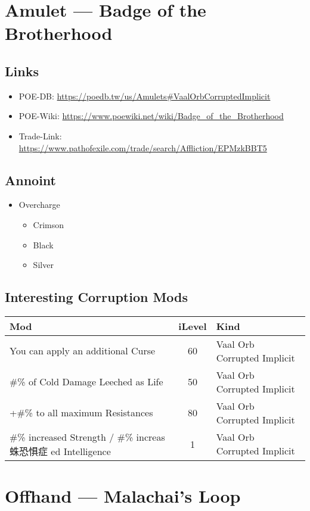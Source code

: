 
\section{Amulet --- Badge of the Brotherhood}
\subsection{Links}
\begin{itemize}
	\item POE-DB: \url{https://poedb.tw/us/Amulets#VaalOrbCorruptedImplicit}
	\item POE-Wiki: \url{https://www.poewiki.net/wiki/Badge_of_the_Brotherhood}
	\item Trade-Link: \url{https://www.pathofexile.com/trade/search/Affliction/EPMzkBBT5}
\end{itemize}

\subsection{Annoint}
\begin{itemize}
	\item Overcharge
	\begin{itemize}
		\item Crimson
		\item Black
		\item Silver
	\end{itemize}
\end{itemize}

\subsection{Interesting Corruption Mods}
\begin{tabular}{|l|c|l|}
	\hline
	Mod&iLevel&Kind\\\hline
	You can apply an additional Curse &60& Vaal Orb Corrupted Implicit \\\hline
	\#\% of Cold Damage Leeched as Life&50& Vaal Orb Corrupted Implicit \\\hline
	+\#\% to all maximum Resistances&80& Vaal Orb Corrupted Implicit \\\hline
	\#\% increased Strength / \#\% increas蛛恐惧症
	ed Intelligence&1& Vaal Orb Corrupted Implicit \\\hline
\end{tabular}

\section{Offhand --- Malachai's Loop}

